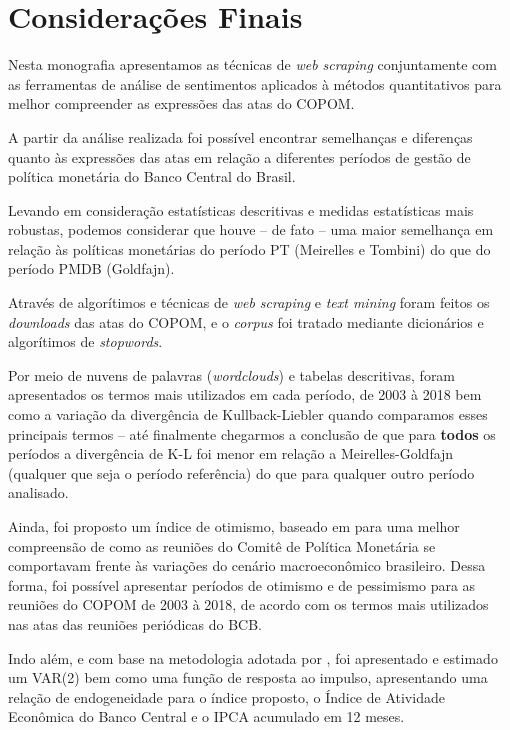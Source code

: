 \chapter{Considerações Finais}

Nesta monografia apresentamos as técnicas de \textit{web scraping} conjuntamente com as ferramentas de análise de sentimentos aplicados à métodos quantitativos para melhor compreender as expressões das atas do COPOM.

A partir da análise realizada foi possível encontrar semelhanças e diferenças quanto às expressões das atas em relação a diferentes períodos de gestão de política monetária do Banco Central do Brasil.

Levando em consideração estatísticas descritivas e medidas estatísticas mais robustas, podemos considerar que houve -- de fato -- uma maior semelhança em relação às políticas monetárias do período PT (Meirelles e Tombini) do que do período PMDB (Goldfajn).

Através de algorítimos e técnicas de \textit{web scraping} e \textit{text mining} foram feitos os \textit{downloads} das atas do COPOM, e o \textit{corpus} foi tratado mediante dicionários e algorítimos de \textit{stopwords}.

Por meio de nuvens de palavras (\textit{wordclouds}) e tabelas descritivas, foram apresentados os termos mais utilizados em cada período, de 2003 à 2018 bem como a variação da divergência de Kullback-Liebler quando comparamos esses principais termos -- até finalmente chegarmos a conclusão de que para \textbf{todos} os períodos a divergência de K-L foi menor em relação a Meirelles-Goldfajn (qualquer que seja o período referência) do que para qualquer outro período analisado.

Ainda, foi proposto um índice de otimismo, baseado em  para uma melhor compreensão de como as reuniões do Comitê de Política Monetária se comportavam frente às variações do cenário macroeconômico brasileiro. Dessa forma, foi possível apresentar períodos de otimismo e de pessimismo para as reuniões do COPOM de 2003 à 2018, de acordo com os termos mais utilizados nas atas das reuniões periódicas do BCB.

Indo além, e com base na metodologia adotada por , foi apresentado e estimado um VAR(2) bem como uma função de resposta ao impulso, apresentando uma relação de endogeneidade para o índice proposto, o Índice de Atividade Econômica do Banco Central e o IPCA acumulado em 12 meses. 

